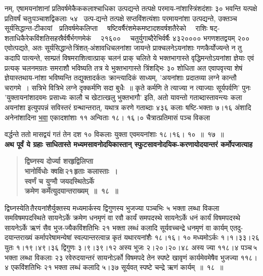 \documentclass[11pt, openany]{book}
\begin{document}
\newpage

\noindent नम्, एषामयनांशानां प्रतिवर्षमेकैककलाश्चाधिका उत्पद्यन्ते तत्पक्षे परमाय-नांशास्त्रिंशदंशाः ३० भवन्ति यत्पक्षे प्रतिवर्षं चतुःपञ्चाशद्विकलाः ५४~ उत्प-द्यन्ते तत्पक्षे सप्तविंशत्यंशाः परमायनांशा उत्पद्यन्ते, उक्तञ्च {\color{violet}सूर्यसिद्धान्त-टीकायां\textendash ~~प्रतिवर्षमेकलिप्ता ~~षष्टिवर्षैरंशमेकमष्टादशवर्षशतैरेको ~~राशिः षट्-शताधिकैरेकविंशतिसहस्रैर्वर्षैर्भगणमेकं ~~२१६०० ~~चतुर्युगाब्दैरेभिर्वर्षैः ४३२०००० भगणशतद्वयम् २०० एवोत्पद्यते}, अतः {\color{violet}सूर्यसिद्धान्ते\textendash \,त्रिंशत्-अंशावधिचलनांशा जायन्ते प्राक्चलनेऽयनांशाः गणकैर्योज्यन्ते न तु कदापि पात्यन्ते}, साम्प्रतं विषमराशित्वात्प्राक् चलनं प्राक् चलिते ये भक्तभागास्ते वृद्धिमन्तोऽयनांशा \;ज्ञेयाः \;एवं \;प्रत्यक् \;चलनमग्रतः \;समराशौ \;भविष्यति तत्र ये भुक्तभागास्ते त्रिंशद्भिः ३० शोधिता अत एवापवृत्त्या शेषं ज्ञेयास्तथाय-नांशा भविष्यन्ति तद्युक्तादर्कतः क्रान्त्यादिकं साध्यम्, {\color{violet}'अयनांशाः प्रदातव्या लग्ने कान्तौ चरागमे~। सत्रिभे वित्रिभे लग्ने दृक्कर्मणि सदा बुधैः~॥ कृते कर्मणि ते त्याज्या न त्याज्याः सूर्यपर्वणि'} पुनः {\color{violet}'युक्तायनांशादवमः प्रसाध्यः कालौ च खेटात्खलु भुक्तभागौ'} इति, अतो यावन्तो गताब्दास्तावन्त्यः कला अयनांशा इत्युपपन्नं सविस्तरं ग्रन्थान्तरात्, यथात्र करणे गताब्दाः ४३६ कलाः षष्टि-भक्ताः ७।१६ अंशादि अनेनांशादिना \hyperref[2.17]{भवा} एकादशांशाः ११ अन्विताः १८। १६।० चैत्रात्प्रतिमासं पञ्च विकला

\newpage

\noindent वर्द्धन्ते ततो मासद्वयं गतं तेन दश १० विकलाः युक्ता एवमयनांशाः १८।१६। १०~॥~१७~॥\\

{\small \textbf{अथ पूर्वं ये ग्रहाः साधितास्ते मध्यमसावनोदयिकास्तान् स्फुटसावनोदयिक-करणायोदयान्तरं कर्मोपजात्याह\textendash }}

 \label{2.18}
\begin{quote}
{\large \textbf{{\color{purple}द्विघ्नस्य दोर्ज्या शरहृद्विलिप्ता \\
भानोर्विधोः क्वक्षि\textendash \,२१\textendash \,हृताः कलास्ताः~। \\
स्वर्णं च युग्मौ जयदस्थितेऽर्के \\
क्रमेण कर्मेत्युदयान्तराख्यम्~॥~१८~॥}}}
\end{quote}

द्विघ्नस्येति\textendash \,तैरयनांशैर्युक्तस्य मध्यमार्कस्य द्विगुणस्य भुजज्या पञ्चभिः ५ भक्ता लब्धा विकला समविषमपदस्थिते सायनेऽर्के क्रमेण धनमृणं वा रवौ कार्यं समपदस्थे सायनेऽर्के धनं कार्यं विषमपदस्थे सायनेऽर्के ऋणं सैव भुज-ज्यैकविंशतिभिः २१ भक्ता लब्धं कलादि सूर्यवच्चन्द्रे धनमृणं वा कार्यम् एतदु-दयान्तराख्यं कर्मापरेषामन्येषां स्वल्पान्तरत्वान्न कृतं यथारयनांशैः १८।१६। १० मध्यमोऽर्कः १।१।३३।२६ युतः १।१९।४९।३६ द्विगुणः ३।९।३९।१२ अस्य भुजः २।२०।२०।४८ अस्य ज्या ११८।४ पञ्च\textendash \,५\textendash \,भक्ता लब्धा विकलाः २३ रवेरुदयान्तरं सायनोऽर्को विषमपदे तेन स्पष्टे खावृणं कार्यमेवमेषैव भुजज्या ११८।४ एकविंशतिभिः २१ भक्ता लब्धं कलादि ५।३७ सूर्यवत् स्पष्टे चन्द्रे ऋणं कार्यम्~॥~१८~॥
\end{document}
